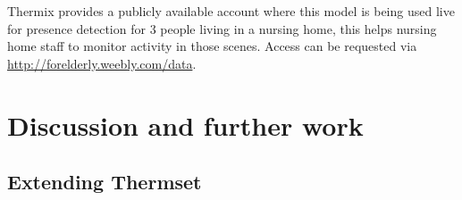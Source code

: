 \documentclass[oneside, twocolumn]{article}
\begin{document}

Thermix provides a publicly available account where this model is being used live for presence
detection for 3 people living in a nursing home, this helps nursing home staff to monitor activity
in those scenes. Access can be requested via \url{http://forelderly.weebly.com/data}.


\section{Discussion and further work}

\subsection{Extending Thermset}
\end{document}
